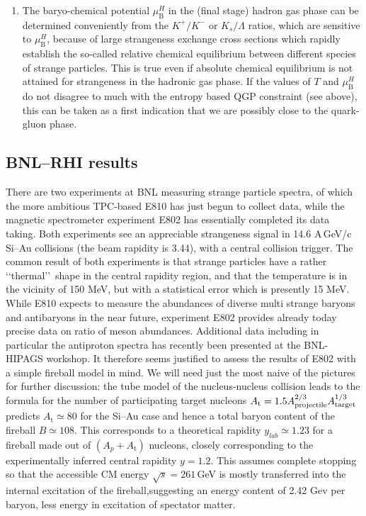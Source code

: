 \begin{mdframed}[linecolor=gray,roundcorner=12pt,backgroundcolor=Dandelion!15,linewidth=1pt,leftmargin=0cm,rightmargin=0cm,topline=true,bottomline=true,skipabove=12pt]
\begin{enumerate}
\item The baryo-chemical potential $\mu_\mathrm{B}^H$ in the (final stage) hadron gas phase can be determined conveniently from the $K^+/K^-$ or $K_s/\Lambda$ ratios, which are sensitive to $\mu_\mathrm{B}^H$\footnotemark[23], because of large strangeness exchange cross sections which rapidly establish the so-called relative chemical equilibrium between different species of strange particles. This is true even if absolute chemical equilibrium is not attained for strangeness in the hadronic gas phase\footnotemark[5]. If the values of $T$ and $\mu_\mathrm{B}^H$ do not disagree to much with the entropy based QGP constraint (see above), this can be taken as a first indication that we are possibly close to the quark-gluon phase. 
\end{enumerate}

\subsection*{BNL--RHI results}
There are two experiments at BNL measuring strange particle spectra, of which the more ambitious TPC-based E810 has just begun to collect data\footnotemark[24], while the magnetic spectrometer experiment E802 has essentially completed its data taking\footnotemark[25]. Both experiments see an appreciable strangeness signal in 14.6 A\,GeV/c Si--Au collisions (the beam rapidity is 3.44), with a central collision trigger. The common result of both experiments is that strange particles have a rather \lq\lq thermal\rq\rq\ shape in the central rapidity region, and that the temperature is in the vicinity of 150 MeV, but with a statistical error which is presently 15 MeV. While E810 expects to measure the abundances of diverse multi strange baryons and antibaryons in the near future, experiment E802 provides already today precise data on ratio of meson abundances\footnotemark[25]. Additional data including in particular the antiproton spectra has recently been presented at the BNL-HIPAGS workshop\footnotemark[26]. It therefore seems justified to assess the results of E802 with a simple fireball model in mind. We will need just the most naive of the pictures for further discussion: the tube model of the nucleus-nucleus collision leads to the formula for the number of participating target nucleons $A_\mathrm{t} = 1.5 A_{\rm projectile}^{2/3}A_{\rm target}^{1/3}$ predicts $A_\mathrm{t} \simeq 80$ for the Si--Au case and hence a total baryon content of the fireball $B \simeq 108$. This corresponds to a theoretical rapidity $y_{lab} \simeq 1.23$ for a fireball made out of $(A_p + A_\mathrm{t})$ nucleons, closely corresponding to the experimentally inferred central rapidity $y = 1.2$. This assumes complete stopping so that the accessible CM energy $\sqrt{s} = 261$\,GeV is mostly transferred into the internal excitation of the fireball,suggesting an energy content of 2.42 Gev per baryon, less energy in excitation of spectator matter. 


\end{mdframed}
